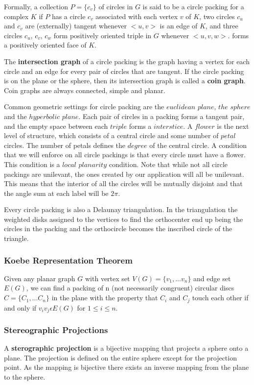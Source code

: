 \documentclass{article}
\begin{document}
  Formally, a collection $P = \{c_v\} $ of circles in $G$ is said to be a circle packing for a complex $K$ if $P$ has a circle $c_v$ associated with each vertex $v$ of $K$, two circles $c_u$ and $c_v$ are (externally) tangent whenever $<u,v>$ is an edge of $K$, and three circles $c_u$, $c_v$, $c_w$ form positively oriented triple in $G$ whenever $<u,v,w>$. forms a positively oriented face of $K$.
   
  The \textbf{intersection graph} of a circle packing is the graph having a vertex for each circle and an edge for every pair of circles that are tangent. 
  If the circle packing is on the plane or the sphere, then its intersection graph is called a \textbf{coin graph}. 
  Coin graphs are always connected, simple and planar. 

    Common geometric settings for circle packing are the $euclidean$ $plane$, $the$ $sphere$ and the $hyperbolic$ $plane$. Each pair of circles in a packing forms a tangent pair, and the empty space between each $triple$ forms a $interstice$. A $flower$ is the next level of structure, which consists of a central circle and some number of $petal$ circles. The number of petals defines the $degree$ of the central circle. A condition that we will enforce on all circle packings is that every circle must have a flower. This condition is a $local$ $planarity$ condition. \citep{introCirlceacking} Note that while not all circle packings are unilevant, the ones created by our application will all be unilevant. This means that the interior of all the circles will be mutually disjoint and that the angle sum at each label will be $2\pi$.
    
    Every circle packing is also a Delaunay triangulation. In the triangulation the weighted disks assigned to the vertices to find the orthocenter end up being the circles in the packing and the orthocircle becomes the inscribed circle of the triangle. 
    
    \subsubsection{Koebe Representation Theorem}
    Given any planar graph $G$ with vertex set $V(G) = \{v_1, ... v_n \}$ and edge set $E(G)$, we can find a packing of n (not necessarily congruent) circular discs $C= \{C_1,... C_n\}$ in the plane with the property that $C_i$ and $C_j$ touch each other if and only if $v_i v_j \epsilon E(G)$ for $1 \le i \le n$. \citep{combinatorialGeometry} 
    \subsubsection{Stereographic Projections}
    A \textbf{sterographic projection} is a bijective mapping that projects a sphere onto a plane.
     The projection is defined on the entire sphere except for the projection point. 
    As the mapping is bijective there exists an inverse mapping from the plane to the sphere.
\end{document}

